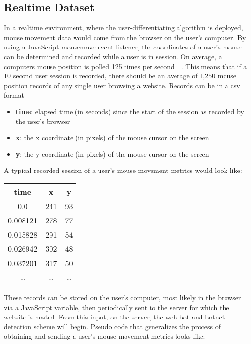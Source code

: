 \subsection{Realtime Dataset}\label{subsec:realtime-dataset}
In a realtime environment, where the user-differentiating algorithm is deployed, mouse movement data would come from the browser on the user's computer.
By using a JavaScript mousemove event listener, the coordinates of a user's mouse can be determined and recorded while a user is in session.
On average, a computers mouse position is polled 125 times per second~\cite{mouse_dpi_and_polling_rate_explained}~\cite{mouse_dpi_and_usb_polling_rate}.
This means that if a 10 second user session is recorded, there should be an average of 1,250 mouse position records of any single user browsing a website.
Records can be in a csv format:
\begin{itemize}
    \item \textbf{time}: elapsed time (in seconds) since the start of the session as recorded by the user's browser
    \item \textbf{x}: the x coordinate (in pixels) of the mouse cursor on the screen
    \item \textbf{y}: the y coordinate (in pixels) of the mouse cursor on the screen
\end{itemize}
A typical recorded session of a user's mouse movement metrics would look like:
\begin{center}
    \begin{tabular}{ |c|c|c| }
        \hline
        \textbf{time} & \textbf{x} & \textbf{y} \\
        \hline
        0.0 & 241 & 93 \\
        0.008121 & 278 & 77 \\
        0.015828 & 291 & 54 \\
        0.026942 & 302 & 48 \\
        0.037201 & 317 & 50 \\
        \ldots & \ldots & \ldots \\
        \hline
    \end{tabular}
\end{center}
These records can be stored on the user's computer, most likely in the browser via a JavaScript variable, then periodically sent to the server for which the website is hosted.
From this input, on the server, the web bot and botnet detection scheme will begin.
Pseudo code that generalizes the process of obtaining and sending a user's mouse movement metrics looks like:

